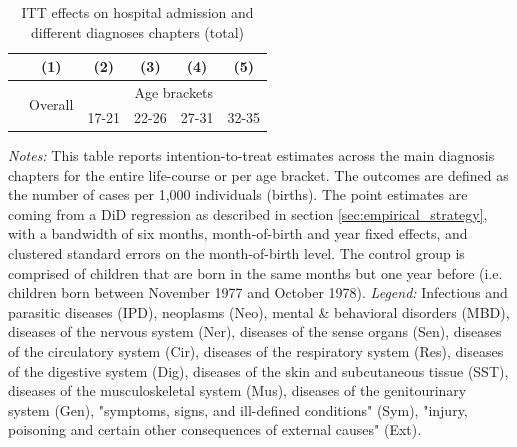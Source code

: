 \documentclass[11pt, a4paper]{article} %
\begin{document}
\newpage



\begin{table}[H] \centering 
	\begin{threeparttable} \centering \caption{ITT effects on hospital admission and different diagnoses chapters (total)}\label{tab: ITT_across_chapters_per_age_group_total}
		{\def\sym#1{\ifmmode^{#1}\else\(^{#1}\)\fi} 
			\begin{tabular}{l*{5}{c}}
				\toprule 
				&\multicolumn{1}{c}{(1)}&\multicolumn{1}{c}{(2)}&\multicolumn{1}{c}{(3)}&\multicolumn{1}{c}{(4)}&\multicolumn{1}{c}{(5)}\\
				\midrule
				&\multirow{2}{*}{Overall} & \multicolumn{4}{c}{Age brackets} \\ 
				\cmidrule(lr){3-6}
				&&\multicolumn{1}{c}{17-21}&\multicolumn{1}{c}{22-26}&\multicolumn{1}{c}{27-31}&\multicolumn{1}{c}{32-35}\\
				
				\midrule
				
				
				
				\bottomrule 
		\end{tabular}}
	\end{threeparttable} 
	\begin{minipage}{0.9\linewidth}
		\scriptsize \emph{Notes:} This table reports intention-to-treat estimates across the main diagnosis chapters for the entire life-course or per age bracket. The outcomes are defined as the number of cases per 1,000 individuals (births). The point estimates are coming from a DiD regression as described in section \ref{sec:empirical_strategy}, with a bandwidth of six months, month-of-birth and year fixed effects, and clustered standard errors on the month-of-birth level. The control group is comprised of children that are born in the same months but one year before (i.e. children born between November 1977 and October 1978).\newline
		\emph{Legend:} Infectious and parasitic diseases (IPD), neoplasms (Neo), mental \& behavioral disorders (MBD), diseases of the nervous system (Ner), diseases of the sense organs (Sen), diseases of the circulatory system (Cir), diseases of the respiratory system (Res), diseases of the digestive system (Dig), diseases of the skin and subcutaneous tissue (SST), diseases of the musculoskeletal system (Mus), diseases of the genitourinary system (Gen), "symptoms, signs, and ill-defined conditions" (Sym), "injury, poisoning and certain other consequences of external causes" (Ext).
	\end{minipage}
\end{table} 
\end{document}
